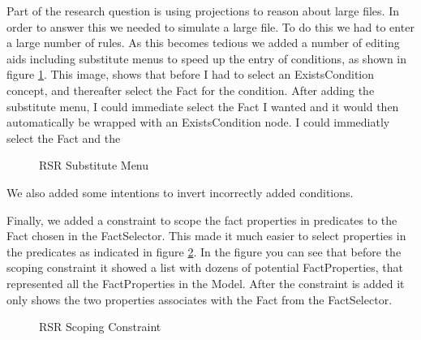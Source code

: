 Part of the research question is using projections to reason about large files.
In order to answer this we needed to simulate a large file.
To do this we had to enter a large number of rules.
As this becomes tedious we added a number of editing aids including substitute menus to speed up the entry of conditions, as shown in figure \ref{fig:RSRSubstituteMenu}.
This image, shows that before I had to select an ExistsCondition concept, and thereafter select the Fact for the condition.
After adding the substitute menu, I could immediate select the Fact I wanted and it would then automatically be wrapped with an ExistsCondition node. I could immediatly select the Fact and the 

\begin{figure}[h]
    \centering
    \caption{RSR Substitute Menu}
    \label{fig:RSRSubstituteMenu}
\end{figure}

We also added some intentions to invert incorrectly added conditions.

Finally, we added a constraint to scope the fact properties in predicates to the Fact chosen in the FactSelector.
This made it much easier to select properties in the predicates as indicated in figure \ref{fig:RSRConstraint}.
In the figure you can see that before the scoping constraint it showed a list with dozens of potential FactProperties, that represented all the FactProperties in the Model.
After the constraint is added it only shows the two properties associates with the Fact from the FactSelector.

\begin{figure}[h]
    \centering
    \caption{RSR Scoping Constraint}
    \label{fig:RSRConstraint}
\end{figure}


